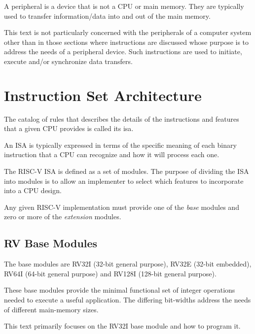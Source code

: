 A peripheral is a device that is not a CPU or main memory.  They are 
typically used to transfer information/data into and out of the 
main memory.

This text is not particularly concerned with the peripherals of a computer
system other than in those sections where instructions are discussed 
whose purpose is to address the needs of a peripheral device.  Such
instructions are used to initiate, execute and/or synchronize data transfers.


\section{Instruction Set Architecture}

The catalog of rules that describes the details of the instructions 
and features that a given CPU provides is called its \acrfull{isa}.

An ISA is typically expressed in terms of the specific meaning of
each binary instruction that a CPU can recognize and how it will
process each one.

The RISC-V ISA is defined as a set of modules.  The purpose of
dividing the ISA into modules is to allow an implementer to select which 
features to incorporate into a CPU design.

Any given RISC-V implementation must provide one of the {\em base}
modules and zero or more of the {\em extension} modules.

\subsection{RV Base Modules}

The base modules are RV32I (32-bit general purpose), 
RV32E (32-bit embedded), RV64I (64-bit general purpose) 
and RV128I (128-bit general purpose).

These base modules provide the minimal functional set of integer operations
needed to execute a useful application.  The differing bit-widths address
the needs of different main-memory sizes.

This text primarily focuses on the RV32I base module and how to program it.


